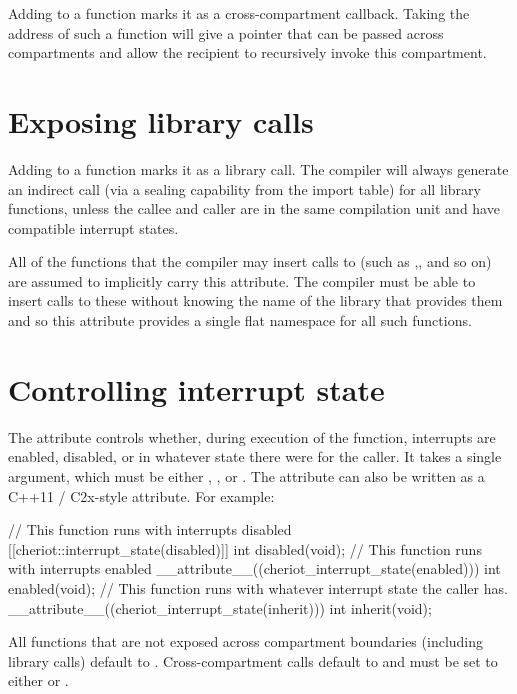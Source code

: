 Adding  to a function marks it as a cross-compartment callback.
Taking the address of such a function will give a pointer that can be passed across compartments and allow the recipient to recursively invoke this compartment.

\section{Exposing library calls}

Adding  to a function marks it as a library call.
The compiler will always generate an indirect call (via a sealing capability from the import table) for all library functions, unless the callee and caller are in the same compilation unit and have compatible interrupt states.

All of the functions that the compiler may insert calls to (such as ,, and so on) are assumed to implicitly carry this attribute.
The compiler must be able to insert calls to these without knowing the name of the library that provides them and so this attribute provides a single flat namespace for all such functions.

\section{Controlling interrupt state}

The  attribute controls whether, during execution of the function, interrupts are enabled, disabled, or in whatever state there were for the caller.
It takes a single argument, which must be either , , or .
The attribute can also be written as a C++11 / C2x-style attribute.
For example:

\begin{ccodelisting}
// This function runs with interrupts disabled
[[cheriot::interrupt_state(disabled)]]
int disabled(void);
// This function runs with interrupts enabled
__attribute__((cheriot_interrupt_state(enabled)))
int enabled(void);
// This function runs with whatever interrupt state the caller has.
__attribute__((cheriot_interrupt_state(inherit)))
int inherit(void);
\end{ccodelisting}

All functions that are not exposed across compartment boundaries (including library calls) default to .
Cross-compartment calls default to  and must be set to either  or .

